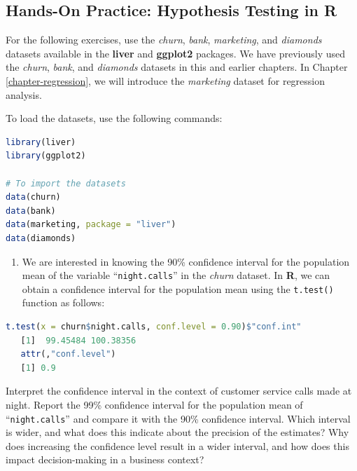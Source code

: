 \documentclass[
]{book}
\newcommand{\passthrough}[1]{#1}
\providecommand{\tightlist}{%
  \setlength{\itemsep}{0pt}\setlength{\parskip}{0pt}}
\theoremstyle{definition}
\theoremstyle{definition}
\theoremstyle{definition}
\theoremstyle{definition}
\theoremstyle{remark}
\begin{document}
\subsection*{Hands-On Practice: Hypothesis Testing in R}\label{hands-on-practice-hypothesis-testing-in-r}

For the following exercises, use the \emph{churn}, \emph{bank}, \emph{marketing}, and \emph{diamonds} datasets available in the \textbf{liver} and \textbf{ggplot2} packages. We have previously used the \emph{churn}, \emph{bank}, and \emph{diamonds} datasets in this and earlier chapters. In Chapter \ref{chapter-regression}, we will introduce the \emph{marketing} dataset for regression analysis.

To load the datasets, use the following commands:

\begin{lstlisting}[language=R]
library(liver)
library(ggplot2)   

# To import the datasets
data(churn)  
data(bank)  
data(marketing, package = "liver")  
data(diamonds)  
\end{lstlisting}

\begin{enumerate}
\def\labelenumi{\arabic{enumi}.}
\setcounter{enumi}{9}
\tightlist
\item
  We are interested in knowing the 90\% confidence interval for the population mean of the variable ``\passthrough{\lstinline!night.calls!}'' in the \emph{churn} dataset. In \textbf{R}, we can obtain a confidence interval for the population mean using the \passthrough{\lstinline!t.test()!} function as follows:
\end{enumerate}

\begin{lstlisting}[language=R]
t.test(x = churn$night.calls, conf.level = 0.90)$"conf.int"
   [1]  99.45484 100.38356
   attr(,"conf.level")
   [1] 0.9
\end{lstlisting}

Interpret the confidence interval in the context of customer service calls made at night. Report the 99\% confidence interval for the population mean of ``\passthrough{\lstinline!night.calls!}'' and compare it with the 90\% confidence interval. Which interval is wider, and what does this indicate about the precision of the estimates? Why does increasing the confidence level result in a wider interval, and how does this impact decision-making in a business context?
\end{document}
